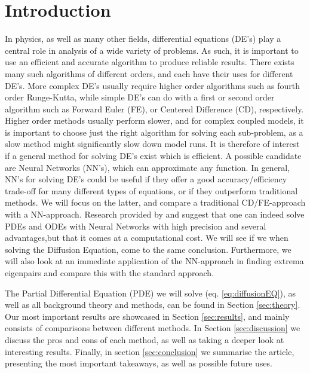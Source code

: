\section{Introduction}
\label{sec:introduction}
In physics, as well as many other fields, differential equations (DE's) play a central role in analysis of a wide variety of problems. As such, it is important to use an efficient and accurate algorithm to produce reliable results. There exists many such algorithms of different orders, and each have their uses for different DE's. More complex DE's usually require higher order algorithms such as fourth order Runge-Kutta, while simple DE's can do with a first or second order algorithm such as Forward Euler (FE), or Centered Difference (CD), respectively. Higher order methods usually perform slower, and for complex coupled models, it is important to choose just the right algorithm for solving each sub-problem, as a slow method might significantly slow down model runs. It is therefore of interest if a general method for solving DE's exist which is efficient. A possible candidate are Neural Networks (NN's), which can approximate any function. In general, NN's for solving DE's could be useful if they offer a good accuracy/efficiency trade-off for many different types of equations, or if they outperform traditional methods. We will focus on the latter, and compare a traditional CD/FE-approach with a NN-approach. Research provided by \cite{lagaris1998artificial} and \cite{chiaramonte2013solving} suggest that one can indeed solve PDEs and ODEs with Neural Networks with high precision and several advantages,but that it comes at a computational cost. We will see if we when solving the Diffusion Equation, come to the same conclusion. Furthermore, we will also look at an immediate application of the NN-approach in finding extrema eigenpairs \citep{yi2004neural} and compare this with the standard approach.

The Partial Differential Equation (PDE) we will solve (eq. \ref{eq:diffusionEQ}), as well as all background theory and methods, can be found in Section \ref{sec:theory}. Our most important results are showcased in Section \ref{sec:results}, and mainly consists of comparisons between different methods. In Section \ref{sec:discussion} we discuss the pros and cons of each method, as well as taking a deeper look at interesting results. Finally, in section \ref{sec:conclusion} we summarise the article, presenting the most important takeaways, as well as possible future uses.
